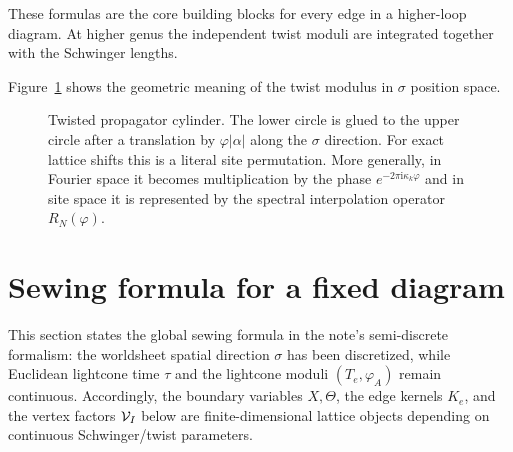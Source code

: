\documentclass[11pt]{article}
\numberwithin{equation}{section}
\begin{document}
These formulas are the core building blocks for every edge in a higher-loop diagram. At higher genus the independent twist moduli are integrated together with the Schwinger lengths.

Figure~\ref{fig:twisted-cylinder} shows the geometric meaning of the twist modulus in $\sigma$ position space.

\begin{figure}[t]
\centering
{}
\caption{Twisted propagator cylinder. The lower circle is glued to the upper circle after a translation by $\varphi|\alpha|$ along the $\sigma$ direction. For exact lattice shifts this is a literal site permutation. More generally, in Fourier space it becomes multiplication by the phase $e^{-2\pi \mathrm{i}\kappa_k\varphi}$ and in site space it is represented by the spectral interpolation operator $R_N(\varphi)$.}
\label{fig:twisted-cylinder}
\end{figure}

\section{Sewing formula for a fixed diagram}
This section states the global sewing formula in the note's semi-discrete formalism: the worldsheet spatial direction $\sigma$ has been discretized, while Euclidean lightcone time $\tau$ and the lightcone moduli $(T_e,\varphi_A)$ remain continuous. Accordingly, the boundary variables $X,\Theta$, the edge kernels $K_e$, and the vertex factors ${\cal V}_I$ below are finite-dimensional lattice objects depending on continuous Schwinger/twist parameters.
\end{document}
